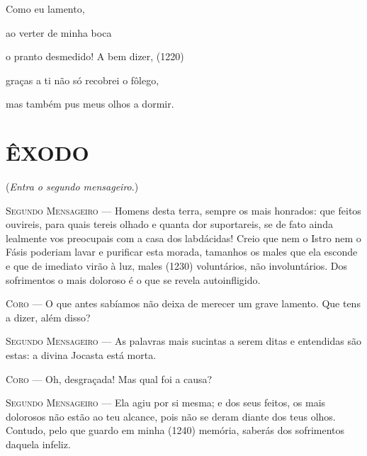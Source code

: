 Como eu lamento,

ao verter de minha boca

o pranto desmedido! A bem dizer, (1220)

graças a ti não só recobrei o fôlego,

mas também pus meus olhos a dormir.

\section{ÊXODO}

(\emph{Entra o segundo mensageiro}.)

\textsc{Segundo Mensageiro} --- Homens desta terra, sempre os mais honrados: que feitos ouvireis, para
quais tereis olhado e quanta dor suportareis, se de fato ainda lealmente
vos preocupais com a casa dos labdácidas! Creio que nem o Istro nem o
Fásis poderiam lavar e purificar esta morada, tamanhos os males que ela
esconde e que de imediato virão à luz, males (1230) voluntários, não
involuntários. Dos sofrimentos o mais doloroso é o que se revela
autoinfligido.

\textsc{Coro} --- O que antes sabíamos não deixa de merecer um grave lamento. Que tens a
dizer, além disso?

\textsc{Segundo Mensageiro} --- As palavras mais sucintas a serem ditas e entendidas são estas: a divina
Jocasta está morta.

\textsc{Coro} --- Oh, desgraçada! Mas qual foi a causa?

\textsc{Segundo Mensageiro} --- Ela agiu por si mesma; e dos seus feitos, os mais dolorosos não estão ao
teu alcance, pois não se deram diante dos teus olhos. Contudo, pelo que
guardo em minha (1240) memória, saberás dos sofrimentos daquela infeliz.

